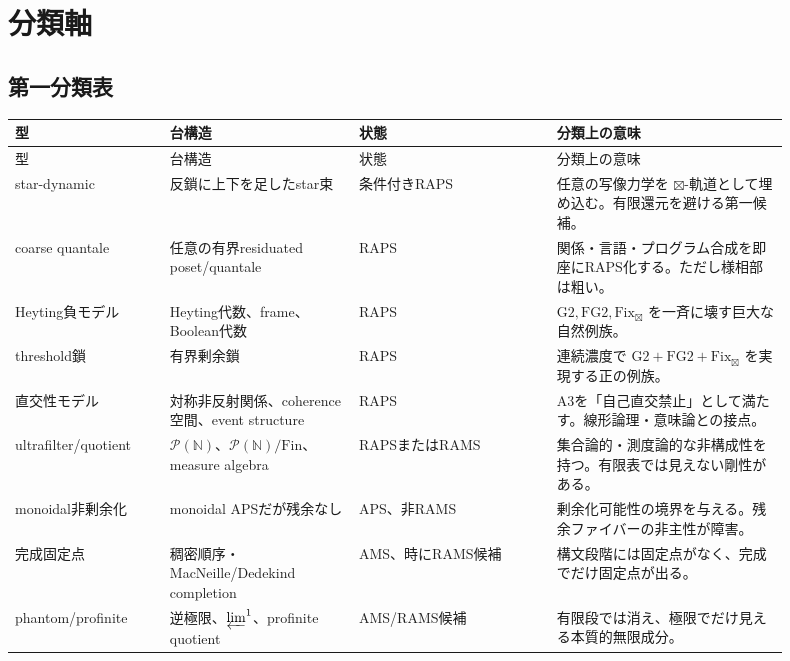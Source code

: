 \documentclass[uplatex,dvipdfmx,a4paper,10pt]{jsarticle}
\newcommand{\Gtwo}{\mathrm{G2}}
\newcommand{\FGtwo}{\mathrm{FG2}}
\newcommand{\Fix}{\mathrm{Fix}}
\newcommand{\bt}{\boxtimes}
\newcommand{\Pow}{\mathcal P}
\newcommand{\N}{\mathbb N}
\begin{document}
\section{分類軸}

\subsection{第一分類表}

\begin{longtable}{>{\raggedright\arraybackslash}p{0.18\linewidth}
                  >{\raggedright\arraybackslash}p{0.22\linewidth}
                  >{\raggedright\arraybackslash}p{0.23\linewidth}
                  >{\raggedright\arraybackslash}p{0.27\linewidth}}
\toprule
型 & 台構造 & 状態 & 分類上の意味 \\
\midrule
\endfirsthead
\toprule
型 & 台構造 & 状態 & 分類上の意味 \\
\midrule
\endhead
star-dynamic &
反鎖に上下を足したstar束 &
条件付きRAPS &
任意の写像力学を \(\bt\)-軌道として埋め込む。有限還元を避ける第一候補。\\
\midrule
coarse quantale &
任意の有界residuated poset/quantale &
RAPS &
関係・言語・プログラム合成を即座にRAPS化する。ただし様相部は粗い。\\
\midrule
Heyting負モデル &
Heyting代数、frame、Boolean代数 &
RAPS &
\(\Gtwo,\FGtwo,\Fix_{\bt}\) を一斉に壊す巨大な自然例族。\\
\midrule
threshold鎖 &
有界剰余鎖 &
RAPS &
連続濃度で \(\Gtwo+\FGtwo+\Fix_{\bt}\) を実現する正の例族。\\
\midrule
直交性モデル &
対称非反射関係、coherence空間、event structure &
RAPS &
A3を「自己直交禁止」として満たす。線形論理・意味論との接点。\\
\midrule
ultrafilter/quotient &
\(\Pow(\N)\)、\(\Pow(\N)/\mathrm{Fin}\)、measure algebra &
RAPSまたはRAMS &
集合論的・測度論的な非構成性を持つ。有限表では見えない剛性がある。\\
\midrule
monoidal非剰余化 &
monoidal APSだが残余なし &
APS、非RAMS &
剰余化可能性の境界を与える。残余ファイバーの非主性が障害。\\
\midrule
完成固定点 &
稠密順序・MacNeille/Dedekind completion &
AMS、時にRAMS候補 &
構文段階には固定点がなく、完成でだけ固定点が出る。\\
\midrule
phantom/profinite &
逆極限、\(\varprojlim^1\)、profinite quotient &
AMS/RAMS候補 &
有限段では消え、極限でだけ見える本質的無限成分。\\
\bottomrule
\end{longtable}
\end{document}
